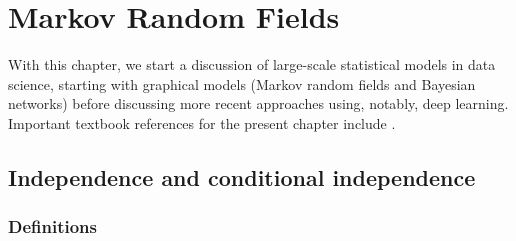 \chapter{Markov Random Fields}
\label{chap:mrf}


With this chapter, we start a discussion of large-scale statistical models in data science, starting with graphical models (Markov random fields and Bayesian networks) before discussing more recent approaches using, notably, deep learning. Important textbook references for the present chapter include \citet{pearl1988probabilistic, ancona1990random,winkler1995image,lauritzen1996graphical,
cowell07probabilistic,koller2009probabilistic}.

\section{Independence and conditional independence}

\subsection{Definitions}
%
%
%
%
%


